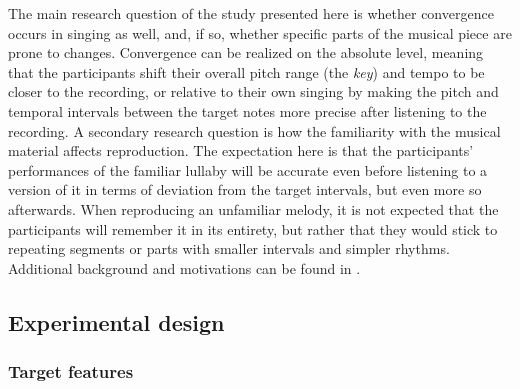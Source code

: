 The main research question of the study presented here is whether convergence occurs in singing as well, and, if so, whether specific parts of the musical piece are prone to changes.
Convergence can be realized on the absolute level, meaning that the participants shift their overall pitch range (the \emph{key}) and tempo to be closer to the recording, or relative to their own singing by making the pitch and temporal intervals between the target notes more precise after listening to the recording.
A secondary research question is how the familiarity with the musical material affects reproduction.
The expectation here is that the participants' performances of the familiar lullaby will be accurate even before listening to a version of it in terms of deviation from the target intervals, but even more so afterwards.
When reproducing an unfamiliar melody, it is not expected that the participants will remember it in its entirety, but rather that they would stick to repeating segments or parts with smaller intervals and simpler rhythms.
Additional background and motivations can be found in \citet{Raveh2020SpeechProsody}.


\subsection{Experimental design}
\label{subsec:design_music}

\subsubsection{Target features}
\label{subsubsec:target_features_music}

